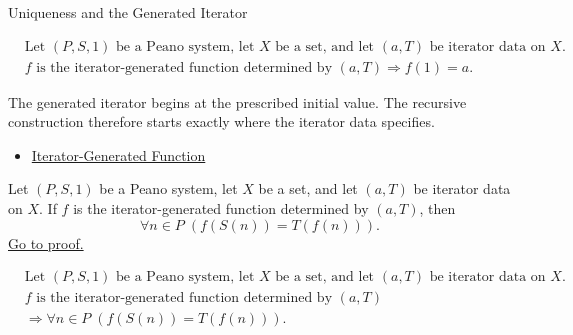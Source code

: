 \begin{topicbox}{Uniqueness and the Generated Iterator}
\begin{remark*}
\[
\begin{aligned}
&\text{Let } (P,S,1) \text{ be a Peano system, let } X \text{ be a set, and let } (a,T) \text{ be iterator data on } X.\\
&f \text{ is the iterator-generated function determined by } (a,T)
\Longrightarrow f(1)=a.
\end{aligned}
\]
\end{remark*}

\begin{remark*}[Interpretation]
The generated iterator begins at the prescribed initial value. The recursive
construction therefore starts exactly where the iterator data specifies.
\end{remark*}

\begin{remark*}[Dependencies]
\begin{itemize}
  \item \hyperref[def:iterator-generated-function]{Iterator-Generated Function}
\end{itemize}
\end{remark*}

\begin{tcolorbox}[colback=thmbox, colframe=thmborder, arc=2pt,
  left=6pt, right=6pt, top=4pt, bottom=4pt,
  title={\small\textbf{Theorem (Iterator Successor Step)}},
  fonttitle=\small\bfseries]
\begin{theorem}
\label{thm:iterator-successor-step}
Let $(P,S,1)$ be a Peano system, let $X$ be a set, and let $(a,T)$ be iterator
data on $X$. If $f$ is the iterator-generated function determined by $(a,T)$,
then
\[
\forall n \in P\;(f(S(n))=T(f(n))).
\]
\hyperref[prf-iterator-successor-step]{Go to proof.}
\end{theorem}
\end{tcolorbox}

\begin{remark*}
\[
\begin{aligned}
&\text{Let } (P,S,1) \text{ be a Peano system, let } X \text{ be a set, and let } (a,T) \text{ be iterator data on } X.\\
&f \text{ is the iterator-generated function determined by } (a,T)\\
&\Longrightarrow
\forall n \in P\;(f(S(n))=T(f(n))).
\end{aligned}
\]
\end{remark*}


\end{topicbox}
